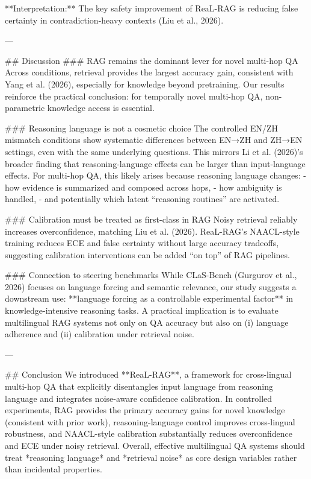 **Interpretation:** The key safety improvement of ReaL-RAG is reducing false certainty in contradiction-heavy contexts (Liu et al., 2026).

---

## Discussion
### RAG remains the dominant lever for novel multi-hop QA
Across conditions, retrieval provides the largest accuracy gain, consistent with Yang et al. (2026), especially for knowledge beyond pretraining. Our results reinforce the practical conclusion: for temporally novel multi-hop QA, non-parametric knowledge access is essential.

### Reasoning language is not a cosmetic choice
The controlled EN/ZH mismatch conditions show systematic differences between EN→ZH and ZH→EN settings, even with the same underlying questions. This mirrors Li et al. (2026)’s broader finding that reasoning-language effects can be larger than input-language effects. For multi-hop QA, this likely arises because reasoning language changes:
- how evidence is summarized and composed across hops,
- how ambiguity is handled,
- and potentially which latent “reasoning routines” are activated.

### Calibration must be treated as first-class in RAG
Noisy retrieval reliably increases overconfidence, matching Liu et al. (2026). ReaL-RAG’s NAACL-style training reduces ECE and false certainty without large accuracy tradeoffs, suggesting calibration interventions can be added “on top” of RAG pipelines.

### Connection to steering benchmarks
While CLaS-Bench (Gurgurov et al., 2026) focuses on language forcing and semantic relevance, our study suggests a downstream use: **language forcing as a controllable experimental factor** in knowledge-intensive reasoning tasks. A practical implication is to evaluate multilingual RAG systems not only on QA accuracy but also on (i) language adherence and (ii) calibration under retrieval noise.

---

## Conclusion
We introduced **ReaL-RAG**, a framework for cross-lingual multi-hop QA that explicitly disentangles input language from reasoning language and integrates noise-aware confidence calibration. In controlled experiments, RAG provides the primary accuracy gains for novel knowledge (consistent with prior work), reasoning-language control improves cross-lingual robustness, and NAACL-style calibration substantially reduces overconfidence and ECE under noisy retrieval. Overall, effective multilingual QA systems should treat *reasoning language* and *retrieval noise* as core design variables rather than incidental properties.

